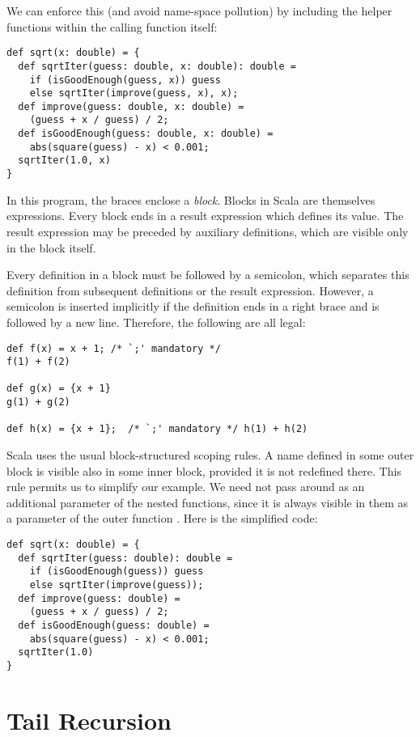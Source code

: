We can enforce this (and avoid name-space pollution) by including
the helper functions within the calling function itself:
\begin{lstlisting}
def sqrt(x: double) = {
  def sqrtIter(guess: double, x: double): double = 
    if (isGoodEnough(guess, x)) guess
    else sqrtIter(improve(guess, x), x);
  def improve(guess: double, x: double) = 
    (guess + x / guess) / 2;
  def isGoodEnough(guess: double, x: double) = 
    abs(square(guess) - x) < 0.001;
  sqrtIter(1.0, x)
}
\end{lstlisting}
In this program, the braces  enclose a {\em block}.
Blocks in Scala are themselves expressions.  Every block ends in a
result expression which defines its value.  The result expression may
be preceded by auxiliary definitions, which are visible only in the
block itself.

Every definition in a block must be followed by a semicolon, which
separates this definition from subsequent definitions or the result
expression. However, a semicolon is inserted implicitly if the
definition ends in a right brace and is followed by a new line.
Therefore, the following are all legal:
\begin{lstlisting}
def f(x) = x + 1; /* `;' mandatory */
f(1) + f(2)

def g(x) = {x + 1}
g(1) + g(2)

def h(x) = {x + 1};  /* `;' mandatory */ h(1) + h(2)
\end{lstlisting}
Scala uses the usual block-structured scoping rules. A name defined in
some outer block is visible also in some inner block, provided it is
not redefined there. This rule permits us to simplify our
 example. We need not pass  around as an additional parameter of
the nested functions, since it is always visible in them as a
parameter of the outer function . Here is the simplified code:
\begin{lstlisting}
def sqrt(x: double) = {
  def sqrtIter(guess: double): double = 
    if (isGoodEnough(guess)) guess
    else sqrtIter(improve(guess));
  def improve(guess: double) = 
    (guess + x / guess) / 2;
  def isGoodEnough(guess: double) = 
    abs(square(guess) - x) < 0.001;
  sqrtIter(1.0)
}
\end{lstlisting}

\section{Tail Recursion}

